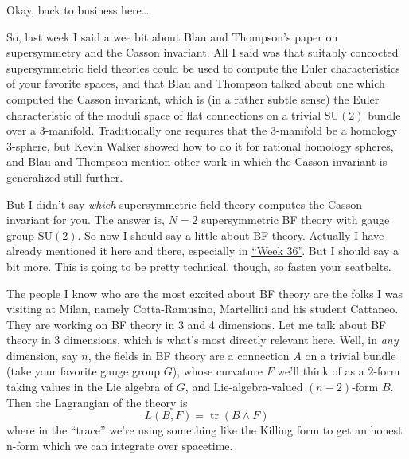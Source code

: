 \documentclass{article}
\renewcommand{\texttt}[1]{%
  \begingroup
  \ttfamily
  \begingroup\lccode`~=`/\lowercase{\endgroup\def~}{/\discretionary{}{}{}}%
  \begingroup\lccode`~=`[\lowercase{\endgroup\def~}{[\discretionary{}{}{}}%
  \begingroup\lccode`~=`.\lowercase{\endgroup\def~}{.\discretionary{}{}{}}%
  \catcode`/=\active\catcode`[=\active\catcode`.=\active
  \scantokens{#1\noexpand}%
  \endgroup
}
\begin{document}
Okay, back to business here\ldots{}


So, last week I said a wee bit about Blau and Thompson's paper on
supersymmetry and the Casson invariant. All I said was that suitably
concocted supersymmetric field theories could be used to compute the
Euler characteristics of your favorite spaces, and that Blau and
Thompson talked about one which computed the Casson invariant, which is
(in a rather subtle sense) the Euler characteristic of the moduli space
of flat connections on a trivial \(\mathrm{SU}(2)\) bundle over a
3-manifold. Traditionally one requires that the 3-manifold be a homology
3-sphere, but Kevin Walker showed how to do it for rational homology
spheres, and Blau and Thompson mention other work in which the Casson
invariant is generalized still further.

But I didn't say \emph{which} supersymmetric field theory computes the
Casson invariant for you. The answer is, \(N = 2\) supersymmetric BF
theory with gauge group \(\mathrm{SU}(2)\). So now I should say a little
about BF theory. Actually I have already mentioned it here and there,
especially in \protect\hyperlink{week36}{``Week 36''}. But I should say
a bit more. This is going to be pretty technical, though, so fasten your
seatbelts.

The people I know who are the most excited about BF theory are the folks
I was visiting at Milan, namely Cotta-Ramusino, Martellini and his
student Cattaneo. They are working on BF theory in 3 and 4 dimensions.
Let me talk about BF theory in 3 dimensions, which is what's most
directly relevant here. Well, in \emph{any} dimension, say \(n\), the
fields in BF theory are a connection \(A\) on a trivial bundle (take
your favorite gauge group \(G\)), whose curvature \(F\) we'll think of
as a \(2\)-form taking values in the Lie algebra of \(G\), and
Lie-algebra-valued \((n-2)\)-form \(B\). Then the Lagrangian of the
theory is \[L(B,F) = \operatorname{tr}(B \wedge F)\] where in the
``trace'' we're using something like the Killing form to get an honest
n-form which we can integrate over spacetime.
\end{document}
